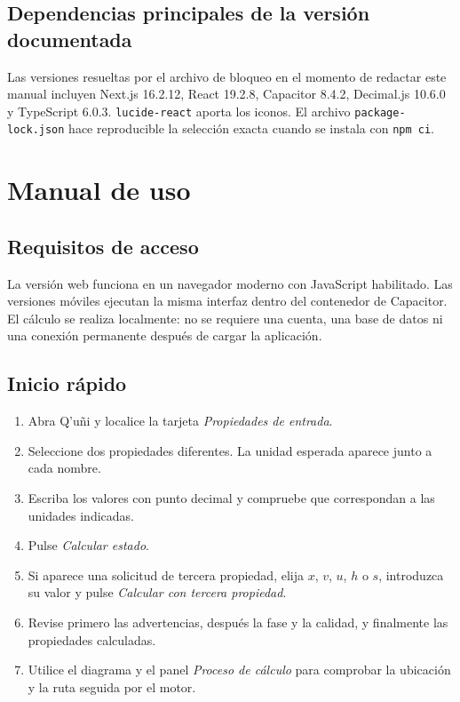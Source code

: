 \documentclass[11pt,a4paper,oneside]{article}
\newcommand{\app}{Q'u\~ni}
\newcommand{\code}[1]{\texttt{#1}}
\begin{document}
\subsection{Dependencias principales de la versi\'on documentada}

Las versiones resueltas por el archivo de bloqueo en el momento de redactar este manual incluyen Next.js 16.2.12, React 19.2.8, Capacitor 8.4.2, Decimal.js 10.6.0 y TypeScript 6.0.3. \code{lucide-react} aporta los iconos. El archivo \code{package-lock.json} hace reproducible la selecci\'on exacta cuando se instala con \code{npm ci}.

\section{Manual de uso}

\subsection{Requisitos de acceso}

La versi\'on web funciona en un navegador moderno con JavaScript habilitado. Las versiones m\'oviles ejecutan la misma interfaz dentro del contenedor de Capacitor. El c\'alculo se realiza localmente: no se requiere una cuenta, una base de datos ni una conexi\'on permanente despu\'es de cargar la aplicaci\'on.

\subsection{Inicio r\'apido}

\begin{enumerate}
  \item Abra \app{} y localice la tarjeta \emph{Propiedades de entrada}.
  \item Seleccione dos propiedades diferentes. La unidad esperada aparece junto a cada nombre.
  \item Escriba los valores con punto decimal y compruebe que correspondan a las unidades indicadas.
  \item Pulse \emph{Calcular estado}.
  \item Si aparece una solicitud de tercera propiedad, elija $x$, $v$, $u$, $h$ o $s$, introduzca su valor y pulse \emph{Calcular con tercera propiedad}.
  \item Revise primero las advertencias, despu\'es la fase y la calidad, y finalmente las propiedades calculadas.
  \item Utilice el diagrama y el panel \emph{Proceso de c\'alculo} para comprobar la ubicaci\'on y la ruta seguida por el motor.
\end{enumerate}
\end{document}
